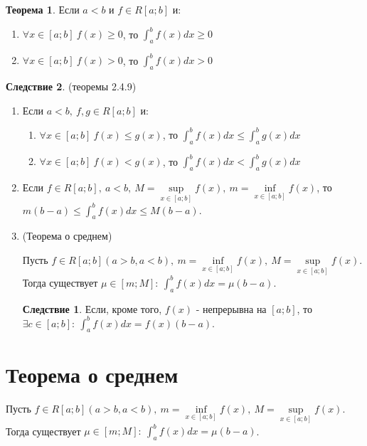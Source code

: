 \documentclass{report}
\theoremstyle{definition}
\newtheorem*{effect}{Следствие}
\newtheorem*{theorem}{Теорема}
\begin{document}
\begin{theorem}
    Если $a<b$ и $f\in R[a;b]$ и:
    \begin{enumerate}
        \item $\forall x \in [a;b] \ f(x) \geqslant 0$, то $\int_{a}^{b} f(x) dx \geqslant 0$
        \item $\forall x \in [a;b] \ f(x) > 0$, то $\int_{a}^{b}f(x)dx > 0$
    \end{enumerate}
\end{theorem}

\begin{effect}
    (теоремы 2.4.9)
    \begin{enumerate}
        \item Если $a<b, \ f,g \in R[a;b]$ и:
              \begin{enumerate}
                  \item $\forall x \in [a;b] \ f(x) \leqslant g(x)$, то $\int_{a}^{b}f(x) dx \leqslant
                            \int_{a}^{b}g(x)dx$
                  \item $\forall x \in [a;b] \ f(x) < g(x)$, то $\int_{a}^{b}f(x)dx < \int_{a}^{b}g(x) dx$
              \end{enumerate}
        \item Если $f\in R[a;b], \ a<b, \ M = \underset{x \in [a;b]}{\sup}f(x), \ m = \underset{x\in[a;b]}
                  {\inf}f(x)$, то $m(b-a) \leqslant \int_{a}^{b}f(x)dx \leqslant M(b-a)$.
        \item (Теорема о среднем)

              Пусть $f\in R[a;b] (a>b, a<b), \ m = \underset{x \in[a;b]}{\inf}f(x), \ M = \underset{x \in[a;b]}{\sup}f(x)$.
              Тогда существует $\mu \in [m;M]: \ \int_{a}^{b}f(x)dx = \mu (b-a)$.

              \begin{effect}
                  Если, кроме того, $f(x)$ - непрерывна на $[a;b]$, то $\exists c \in [a;b]: \ \int_{a}^{b}f(x)dx =
                      f(x)(b-a)$.
              \end{effect}

    \end{enumerate}
\end{effect}

\section{Теорема о среднем}

Пусть $f\in R[a;b] (a>b, a<b), \ m = \underset{x \in[a;b]}{\inf}f(x), \ M = \underset{x \in[a;b]}{\sup}f(x)$.
Тогда существует $\mu \in [m;M]: \ \int_{a}^{b}f(x)dx = \mu (b-a)$.
\end{document}
